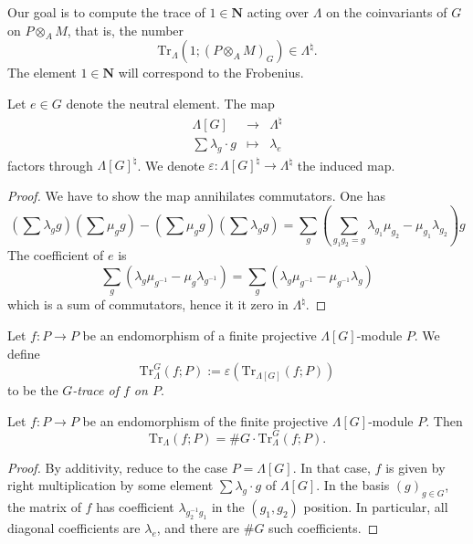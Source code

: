 \medskip\noindent
Our goal is to compute the trace of $1 \in \mathbf{N}$ acting over $\Lambda$
on the coinvariants of $G$ on $P \otimes_A M$, that is, the number
$$
\text{Tr}_{\Lambda}\left(1; \left(P \otimes_A M\right)_G\right) \in
\Lambda^\natural.
$$
The element $1\in \mathbf{N}$ will correspond to the Frobenius.

\begin{lemma}
\label{lemma-epsilon}
Let $e\in G$ denote the neutral element. The map
$$
\begin{matrix}
\Lambda[G] & \longrightarrow & \Lambda^{\natural}\\
\sum \lambda_g\cdot g & \longmapsto & \lambda_e
\end{matrix}
$$
factors through $\Lambda[G]^\natural$. We denote
$\varepsilon : \Lambda[G]^\natural\to \Lambda^\natural$ the induced map.
\end{lemma}

\begin{proof}
We have to show the map annihilates commutators. One has
$$
\left(\sum\lambda_g g\right)\left(\sum\mu_g g\right)-\left(\sum \mu_g
g\right)\left(\sum\lambda_g g\right)
= \sum_g\left(\sum_{g_1g_2=g}
\lambda_{g_1}\mu_{g_2}-\mu_{g_1}\lambda_{g_2}\right)g
$$
The coefficient of $e$ is
$$
\sum_g\left(\lambda_g\mu_{g^{-1}}-\mu_g\lambda_{g^{-1}}\right) =
\sum_g\left(\lambda_g\mu_{g^{-1}}-\mu_{g^{-1}}\lambda_g\right)
$$
which is a sum of commutators, hence it it zero in $\Lambda^\natural$.
\end{proof}

\begin{definition}
\label{definition-trace-G}
Let $f : P\to P$ be an
endomorphism of a finite projective $\Lambda[G]$-module
$P$. We define
$$
\text{Tr}_{\Lambda}^G(f; P) := \varepsilon\left(\text{Tr}_{\Lambda[G]}(f;
P)\right)
$$
to be the {\it $G$-trace of $f$ on $P$}.
\end{definition}

\begin{lemma}
\label{lemma-lambda-trace}
Let $f : P\to P$ be an endomorphism of the finite projective
$\Lambda[G]$-module $P$. Then
$$
\text{Tr}_{\Lambda}(f; P) = \# G \cdot \text{Tr}_\Lambda^G(f; P).
$$
\end{lemma}

\begin{proof}
By additivity, reduce to the case $P = \Lambda[G]$.
In that case, $f$ is given by
right multiplication by some element $\sum\lambda_g\cdot g$ of $\Lambda[G]$. In
the basis $(g)_{g \in G}$, the matrix of $f$ has coefficient
$\lambda_{g_2^{-1}g_1}$ in the $(g_1, g_2)$ position. In particular, all
diagonal coefficients are $\lambda_e$, and there are $\# G$ such coefficients.
\end{proof}

